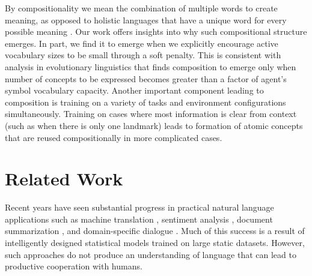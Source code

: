 \documentclass[letterpaper]{article} %
\newcommand{\IM}[1]{\textbf{\textcolor{red}{[IM: #1]}}}
\begin{document}
By compositionality we mean the combination of multiple words to create meaning, as opposed to holistic languages that have a unique word for every possible meaning \cite{kirby01spontaneous}. Our work offers insights into why such compositional structure emerges. In part, we find it to emerge when we explicitly encourage active vocabulary sizes to be small through a soft penalty. This is consistent with analysis in evolutionary linguistics \cite{nowak00syntax} that finds composition to emerge only when number of concepts to be expressed becomes greater than a factor of agent's symbol vocabulary capacity. Another important component leading to composition is training on a variety of tasks and environment configurations simultaneously. Training on cases where most information is clear from context (such as when there is only one landmark) leads to formation of atomic concepts that are reused compositionally in more complicated cases.


\section{Related Work}
\label{sec:related}


Recent years have seen substantial progress in practical natural language applications such as machine translation \cite{sutskever14,bahdanau14}, sentiment analysis \cite{socher13}, document summarization \cite{durrett16}, and domain-specific dialogue \cite{dhingra16}. Much of this success is a result of intelligently designed statistical models trained on large static datasets. However, such approaches do not produce an understanding of language that can lead to productive cooperation with humans.

\end{document}
